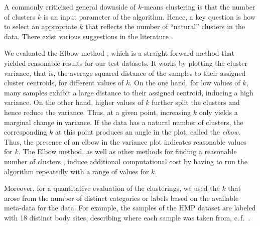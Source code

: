 A commonly criticized general downside of $k$-means clustering is
that the number of clusters $k$ is an input parameter of the algorithm.
Hence, a key question is how to select an appropriate $k$
that reflects the number of ``natural'' clusters in the data.
There exist various suggestions in the literature
\cite{Thorndike1953,Rousseeuw1987,Bischof1999,Pelleg2000,Tibshirani2001,Hamerly2004}.

We evaluated the Elbow method \cite{Thorndike1953},
which is a straight forward method that yielded reasonable results for our test datasets.
It works by plotting the cluster variance,
that is, the average squared distance of the samples to their assigned cluster centroids,
for different values of $k$.
On the one hand, for low values of $k$, many samples exhibit a large distance to their assigned centroid,
inducing a high variance.
On the other hand, higher values of $k$ further split the clusters and hence reduce the variance.
Thus, at a given point, increasing $k$ only yields a marginal change in variance.
If the data has a natural number of clusters, the corresponding $k$ at this point produces an angle in the plot,
called the \emph{elbow}.
Thus, the presence of an elbow in the variance plot indicates reasonable values for $k$.
The Elbow method, as well as other methods for finding a reasonable number of clusters \cite{Rousseeuw1987},
induce additional computational cost by having to run the algorithm repeatedly with a range of values for $k$.

Moreover, for a quantitative evaluation of the clusterings,
we used the $k$ that arose from the number of distinct categories or labels based on the available meta-data for the data.
For example, the samples of the \ac{HMP} dataset are labeled with \num{18} distinct body sites,
describing where each sample was taken from, c.\,f.~.


